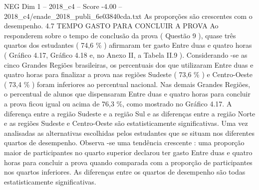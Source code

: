 \begin{textsample}{NEG Dim 1 – 2018\_c4 – Score -4.00 – 2018\_c4/enade\_2018\_publi\_6e03840cda.txt}
As proporções são crescentes com o desempenho. 4.7 TEMPO GASTO PARA CONCLUIR A PROVA Ao responderem sobre o tempo de conclusão da prova ( Questão 9 ), quase três quartos dos estudantes ( 74,6 \% ) afirmaram ter gasto Entre duas e quatro horas ( Gráfico 4.17, Gráfico 4.18 e, no Anexo II, a Tabela II.9 ).
Considerando -se as cinco Grandes Regiões brasileiras, os percentuais dos que utilizaram Entre duas e quatro horas para finalizar a prova nas regiões Sudeste ( 73,6 \% ) e Centro-Oeste ( 73,4 \% ) foram inferiores ao percentual nacional.
Nas demais Grandes Regiões, o percentual de alunos que dispensaram Entre duas e quatro horas para concluir a prova ficou igual ou acima de 76,3 \%, como mostrado no Gráfico 4.17.
A diferença entre a região Sudeste e a região Sul e as diferenças entre a região Norte e as regiões Sudeste e Centro-Oeste são estatisticamente significativas.
Uma vez analisadas as alternativas escolhidas pelos estudantes que se situam nos diferentes quartos de desempenho.
Observa -se uma tendência crescente : uma proporção maior de participantes no quarto superior declarou ter gasto Entre duas e quatro horas para concluir a prova quando comparada com a proporção de participantes nos quartos inferiores.
As diferenças entre os quartos de desempenho são todas estatisticamente significativas.

\end{textsample}
